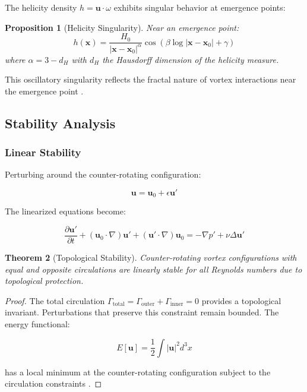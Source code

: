 \documentclass[12pt]{article}
\newcommand{\vorticity}{\omega}
\newtheorem{theorem}{Theorem}[section]
\newtheorem{proposition}[theorem]{Proposition}
\begin{document}
The helicity density $h = \mathbf{u} \cdot \vorticity$ exhibits singular behavior at emergence points:

\begin{proposition}[Helicity Singularity]
Near an emergence point:
\begin{equation}
h(\mathbf{x}) = \frac{H_0}{|\mathbf{x} - \mathbf{x}_0|^\alpha} \cos(\beta \log|\mathbf{x} - \mathbf{x}_0| + \gamma)
\end{equation}
where $\alpha = 3 - d_H$ with $d_H$ the Hausdorff dimension of the helicity measure.
\end{proposition}

This oscillatory singularity reflects the fractal nature of vortex interactions near the emergence point \cite{moffatt1985,ricca1992}.

\subsection{Stability Analysis}

\subsubsection{Linear Stability}

Perturbing around the counter-rotating configuration:

\begin{equation}
\mathbf{u} = \mathbf{u}_0 + \epsilon \mathbf{u}'
\end{equation}

The linearized equations become:

\begin{equation}
\frac{\partial \mathbf{u}'}{\partial t} + (\mathbf{u}_0 \cdot \nabla)\mathbf{u}' + (\mathbf{u}' \cdot \nabla)\mathbf{u}_0 = -\nabla p' + \nu \Delta \mathbf{u}'
\end{equation}

\begin{theorem}[Topological Stability]
Counter-rotating vortex configurations with equal and opposite circulations are linearly stable for all Reynolds numbers due to topological protection.
\end{theorem}

\begin{proof}
The total circulation $\Gamma_{\text{total}} = \Gamma_{\text{outer}} + \Gamma_{\text{inner}} = 0$ provides a topological invariant. Perturbations that preserve this constraint remain bounded. The energy functional:

\begin{equation}
E[\mathbf{u}] = \frac{1}{2}\int |\mathbf{u}|^2 d^3x
\end{equation}

has a local minimum at the counter-rotating configuration subject to the circulation constraints \cite{arnold1966,holm1985}.
\end{proof}
\end{document}
